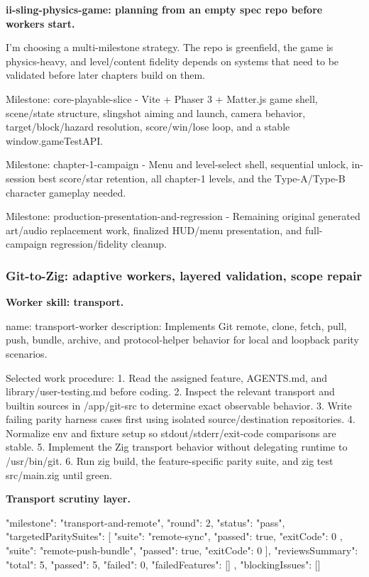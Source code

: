 \documentclass[11pt,a4paper]{article}
\begin{document}
\textbf{ii-sling-physics-game: planning from an empty spec repo before workers start.}

\begin{cbox}
I'm choosing a multi-milestone strategy. The repo is greenfield, the game is
physics-heavy, and level/content fidelity depends on systems that need to be
validated before later chapters build on them.

Milestone: core-playable-slice
- Vite + Phaser 3 + Matter.js game shell, scene/state structure, slingshot
  aiming and launch, camera behavior, target/block/hazard resolution, score/win/lose
  loop, and a stable window.gameTestAPI.

Milestone: chapter-1-campaign
- Menu and level-select shell, sequential unlock, in-session best score/star
  retention, all chapter-1 levels, and the Type-A/Type-B character gameplay needed.

Milestone: production-presentation-and-regression
- Remaining original generated art/audio replacement work, finalized HUD/menu
  presentation, and full-campaign regression/fidelity cleanup.
\end{cbox}

\subsubsection{Git-to-Zig: adaptive workers, layered validation, scope repair}

\textbf{Worker skill: transport.}

\begin{cbox}
name: transport-worker
description: Implements Git remote, clone, fetch, pull, push, bundle, archive,
  and protocol-helper behavior for local and loopback parity scenarios.

Selected work procedure:
1. Read the assigned feature, AGENTS.md, and library/user-testing.md before coding.
2. Inspect the relevant transport and builtin sources in /app/git-src to determine
   exact observable behavior.
3. Write failing parity harness cases first using isolated source/destination repositories.
4. Normalize env and fixture setup so stdout/stderr/exit-code comparisons are stable.
5. Implement the Zig transport behavior without delegating runtime to /usr/bin/git.
6. Run zig build, the feature-specific parity suite, and zig test src/main.zig until green.
\end{cbox}

\textbf{Transport scrutiny layer.}

\begin{cbox}
{
  "milestone": "transport-and-remote",
  "round": 2,
  "status": "pass",
  "targetedParitySuites": [
    { "suite": "remote-sync",        "passed": true, "exitCode": 0 },
    { "suite": "remote-push-bundle", "passed": true, "exitCode": 0 }
  ],
  "reviewsSummary": { "total": 5, "passed": 5, "failed": 0, "failedFeatures": [] },
  "blockingIssues": []
}
\end{cbox}
\end{document}
